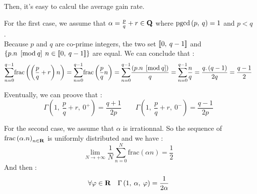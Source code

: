 Then, it's easy to calcul the average gain rate.

For the first case, we assume that $\alpha=\frac{p}{q}+r\in\textbf{Q}$ where $\mathrm{pgcd}\left(p,\: q\right)=1$ and $ p<q $.\\
Because $p$ and $q$ are co-prime integers, the two set $\left[\!\left[0,\:q-1\right]\!\right]$ and
$\left\{p.n\;\left[\mathrm{mod}\: q\right]\: n\in\left[\!\left[0,\:q-1\right]\!\right]\right\}$ are equal.
We can conclude that :\[
\underset{n=0}{\overset{q-1}{\sum}}\mathrm{frac}\left(\left(\frac{p}{q}+r\right)n\right)
=\underset{n=0}{\overset{q-1}{\sum}}\mathrm{frac}\left(\frac{p}{q}n\right)
=\underset{n=0}{\overset{q-1}{\sum}}\frac{\left(p.n\;\left[\mathrm{mod}\: q\right]\right)}{q}
=\underset{n=0}{\overset{q-1}{\sum}}\frac{n}{q}=\frac{q.\left(q-1\right)}{2q}=\frac{q-1}{2}\]

Eventually, we can proove that : \[
\Gamma\left(1,\:\frac{p}{q}+r,\:0^{+}\right)=\frac{q+1}{2p} \qquad
\Gamma\left(1,\:\frac{p}{q}+r,\:0^{-}\right)=\frac{q-1}{2p}
\]

For the second case, we assume that $\alpha$ is irrationnal.
So the sequence of $ \mathrm{frac}\left(\alpha.n\right)_{n\in\textbf{R}} $ is uniformly distributed
and we have : \[
\lim_{N\rightarrow+\infty}\frac{1}{N}
\underset{n=0}{\overset{N}{\sum}}\mathrm{frac}\left(\alpha n\right) = \frac{1}{2}
\]
And then : \[
\forall\varphi\in\textbf{R}\quad\Gamma\left(1,\:\alpha,\:\varphi\right)=\frac{1}{2\alpha}
\]